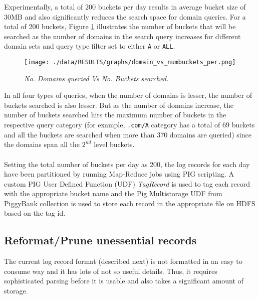 \documentclass[11pt,a4paper]{article}
\begin{document}
\noindent
Experimentally, a total of $200$ buckets per day results in average  bucket size of 30MB and also significantly reduces the search space for domain queries. For a total of 200 buckets, Figure \ref{doms} illustrates the number of buckets that will be searched as the number of domains in the search query increases for different domain sets and query type filter set to either \texttt{A} or \texttt{ALL}.

\begin{figure}[H] 
\centering
\texttt{[image: ./data/RESULTS/graphs/domain\_vs\_numbuckets\_per.png]}
\caption {\textit{No. Domains queried Vs No. Buckets searched.}}
\label{doms}
\end{figure}

\noindent
In all four types of queries, when the number of domains is lesser, the number of buckets searched is also lesser. But as the number of domains increase, the number of buckets searched hits the maximum number of buckets in the respective query category (for example, \texttt{.com/A} category has a total of 69 buckets and all the buckets are searched when more than 370 domains are queried) since the domains span all the $2^{nd}$ level buckets.
\\\\
Setting the total number of buckets per day as 200, the log records for each day have been partitioned by running Map-Reduce jobs using PIG scripting. A custom PIG User Defined Function (UDF) \textit{TagRecord} is used to tag each record with the appropriate bucket name and the Pig Multistorage UDF from PiggyBank collection is used to store each record in the appropriate file on HDFS based on the tag id.

\subsection {Reformat/Prune unessential records}
The current log record format (described next) is not formatted in an easy to consume way and it has lots of not so useful details. Thus, it requires sophisticated parsing before it is usable and also takes a significant amount of storage.
\end{document}
